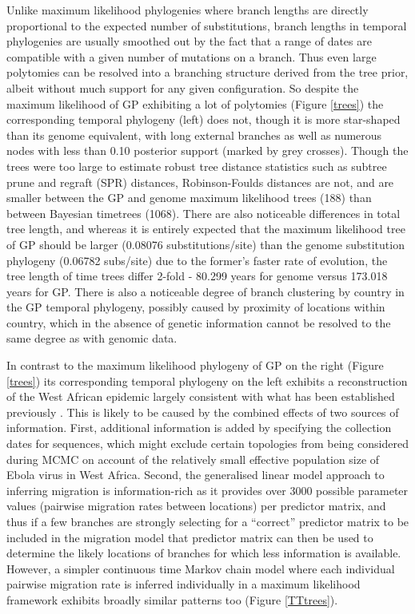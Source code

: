 \documentclass{bmcart}
\begin{document}
Unlike maximum likelihood phylogenies where branch lengths are directly proportional to the expected number of substitutions, branch lengths in temporal phylogenies are usually smoothed out by the fact that a range of dates are compatible with a given number of mutations on a branch.
Thus even large polytomies can be resolved into a branching structure derived from the tree prior, albeit without much support for any given configuration.
So despite the maximum likelihood of GP exhibiting a lot of polytomies (Figure \ref{trees}) the corresponding temporal phylogeny (left) does not, though it is more star-shaped than its genome equivalent, with long external branches as well as numerous nodes with less than 0.10 posterior support (marked by grey crosses).
Though the trees were too large to estimate robust tree distance statistics such as subtree prune and regraft (SPR) distances, Robinson-Foulds distances are not, and are smaller between the GP and genome maximum likelihood trees (188) than between Bayesian timetrees (1068).
There are also noticeable differences in total tree length, and whereas it is entirely expected that the maximum likelihood tree of GP should be larger (0.08076 substitutions/site) than the genome substitution phylogeny (0.06782 subs/site) due to the former's faster rate of evolution, the tree length of time trees differ 2-fold - 80.299 years for genome versus 173.018 years for GP.
There is also a noticeable degree of branch clustering by country in the GP temporal phylogeny, possibly caused by proximity of locations within country, which in the absence of genetic information cannot be resolved to the same degree as with genomic data.

In contrast to the maximum likelihood phylogeny of GP on the right (Figure \ref{trees}) its corresponding temporal phylogeny on the left exhibits a reconstruction of the West African epidemic largely consistent with what has been established previously \cite{dudas_virus_2017}.
This is likely to be caused by the combined effects of two sources of information.
First, additional information is added by specifying the collection dates for sequences, which might exclude certain topologies from being considered during MCMC on account of the relatively small effective population size of Ebola virus in West Africa.
Second, the generalised linear model approach to inferring migration is information-rich as it provides over 3000 possible parameter values (pairwise migration rates between locations) per predictor matrix, and thus if a few branches are strongly selecting for a ``correct'' predictor matrix to be included in the migration model that predictor matrix can then be used to determine the likely locations of branches for which less information is available.
However, a simpler continuous time Markov chain model where each individual pairwise migration rate is inferred individually in a maximum likelihood framework exhibits broadly similar patterns too (Figure \ref{TTtrees}).
\end{document}
